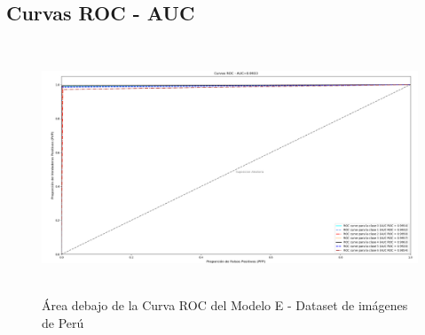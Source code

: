 		\subsection{Curvas ROC - AUC}  
					\begin{figure}[H]
						\includegraphics[width=1\textwidth, height=7.5cm]{images/desarrollo/testResults/peru/ROC_curve_modelE} 
						\begin{center}
						\caption{\small{Área debajo de la Curva ROC del Modelo E - Dataset de imágenes de Perú}}
						
						{\small{\fontsize{10}{16.8}\selectfont {Fuente: Elaboración propia}}}
						\end{center}
						\vspace{-1.5em}
					\end{figure}

